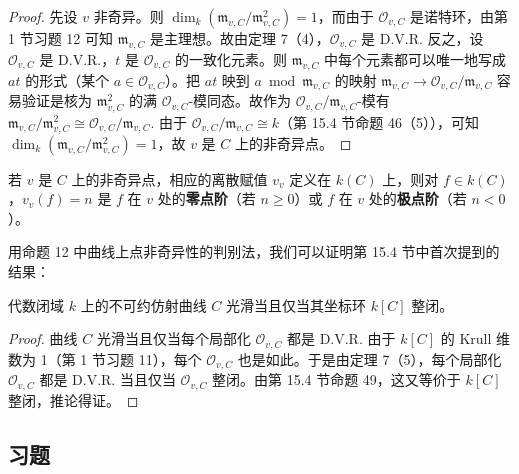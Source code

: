 \begin{proof}
先设 \(v\) 非奇异。则 \(\dim_k(\mathfrak{m}_{v,C}/\mathfrak{m}_{v,C}^2) = 1\)，而由于 \(\mathcal{O}_{v,C}\) 是诺特环，由第 1 节习题 12 可知 \(\mathfrak{m}_{v,C}\) 是主理想。故由定理 7（4），\(\mathcal{O}_{v,C}\) 是 D.V.R. 反之，设 \(\mathcal{O}_{v,C}\) 是 D.V.R.，\(t\) 是 \(\mathcal{O}_{v,C}\) 的一致化元素。则 \(\mathfrak{m}_{v,C}\) 中每个元素都可以唯一地写成 \(at\) 的形式（某个 \(a \in \mathcal{O}_{v,C}\)）。把 \(at\) 映到 \(a \bmod \mathfrak{m}_{v,C}\) 的映射 \(\mathfrak{m}_{v,C} \to \mathcal{O}_{v,C}/\mathfrak{m}_{v,C}\) 容易验证是核为 \(\mathfrak{m}_{v,C}^2\) 的满 \(\mathcal{O}_{v,C}\)-模同态。故作为 \(\mathcal{O}_{v,C}/\mathfrak{m}_{v,C}\)-模有 \(\mathfrak{m}_{v,C}/\mathfrak{m}_{v,C}^2 \cong \mathcal{O}_{v,C}/\mathfrak{m}_{v,C}\). 由于 \(\mathcal{O}_{v,C}/\mathfrak{m}_{v,C} \cong k\)（第 15.4 节命题 46（5）），可知 \(\dim_k(\mathfrak{m}_{v,C}/\mathfrak{m}_{v,C}^2) = 1\)，故 \(v\) 是 \(C\) 上的非奇异点。
\end{proof}

\begin{definition}
若 \(v\) 是 \(C\) 上的非奇异点，相应的离散赋值 \(v_v\) 定义在 \(k(C)\) 上，则对 \(f \in k(C)\)，\(v_v(f) = n\) 是 \(f\) 在 \(v\) 处的\textbf{零点阶}（若 \(n \geq 0\)）或 \(f\) 在 \(v\) 处的\textbf{极点阶}（若 \(n < 0\)）。
\end{definition}

用命题 12 中曲线上点非奇异性的判别法，我们可以证明第 15.4 节中首次提到的结果：

\begin{corollary}\label{cor:16.13}
代数闭域 \(k\) 上的不可约仿射曲线 \(C\) 光滑当且仅当其坐标环 \(k[C]\) 整闭。
\end{corollary}

\begin{proof}
曲线 \(C\) 光滑当且仅当每个局部化 \(\mathcal{O}_{v,C}\) 都是 D.V.R. 由于 \(k[C]\) 的 Krull 维数为 1（第 1 节习题 11），每个 \(\mathcal{O}_{v,C}\) 也是如此。于是由定理 7（5），每个局部化 \(\mathcal{O}_{v,C}\) 都是 D.V.R. 当且仅当 \(\mathcal{O}_{v,C}\) 整闭。由第 15.4 节命题 49，这又等价于 \(k[C]\) 整闭，推论得证。
\end{proof}

\subsection*{习题}

